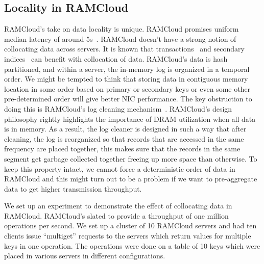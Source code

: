 \subsection{Locality in RAMCloud}
RAMCloud's take on data locality is unique. RAMCloud promises uniform median latency of around 5\textmu s~\cite{ramcloud}. RAMCloud doesn't have a strong notion of collocating data across servers. 
It is known that transactions~\cite{ramcloudtx} and secondary indices~\cite{slik} can benefit with collocation of data. RAMCloud's data is hash partitioned, and within a server, the in-memory log is organized 
in a temporal order. We might be tempted to think that storing data in contiguous memory location in some order based on primary or secondary keys or even some other pre-determined order will give better NIC performance. 
The key obstruction to doing this is RAMCloud's log cleaning mechanism~\cite{ramcloudfast}. RAMCloud's design philosophy rightly highlights the importance of DRAM utilization when all data is in memory. 
As a result, the log cleaner is designed in such a way that after cleaning, the log is reorganized so that records that are accessed in the same frequency are placed together, this makes sure that the records in the same 
segment get garbage collected together freeing up more space than otherwise. To keep this property intact, we cannot force a deterministic order of data in RAMCloud and this might turn out to be a problem if 
we want to pre-aggregate data to get higher transmission throughput.

We set up an experiment to demonstrate the effect of collocating data in RAMCloud. RAMCloud's slated to provide a throughput of one million operations per second. We set up a cluster of 10 RAMCloud servers 
and had ten clients issue ``multiget'' requests to the servers which return values for multiple keys in one operation. The operations were done on a table of 10 keys which were placed in various servers in different 
configurations. 

